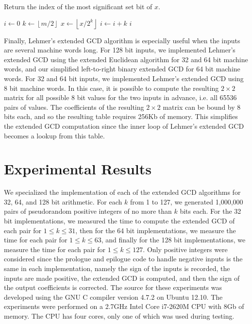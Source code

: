 \documentclass{ucalgthes1}
\theoremstyle{definition}
\newcommand{\floor}[1]{\left\lfloor #1 \right\rfloor}
\newcommand{\compiler}{GNU C compiler version 4.7.2}
\newcommand{\cpu}{2.7GHz Intel Core i7-2620M CPU}
\begin{document}
\begin{algorithm}[htb]
\caption{Return the index of the most significant set bit of $x$.}
\label{alg:msb}
\begin{algorithmic}[1]
\State $i \gets 0$
\State $k \gets \floor{m/2}$ 
		\State $x \gets \floor{x / 2^k}$
		\State $i \gets i + k$
	\EndIf
\EndWhile
\State \Return $i$
\end{algorithmic}
\end{algorithm}

Finally, Lehmer's extended GCD algorithm is especially useful when the inputs are several machine words long.  For 128 bit inputs, we implemented Lehmer's extended GCD using the extended Euclidean algorithm for 32 and 64 bit machine words, and our simplified left-to-right binary extended GCD for 64 bit machine words.  For 32 and 64 bit inputs, we implemented Lehmer's extended GCD using 8 bit machine words.  In this case, it is possible to compute the resulting $2 \times 2$ matrix for all possible 8 bit values for the two inputs in advance, i.e. all 65536 pairs of values.  The coefficients of the resulting $2 \times 2$ matrix can be bound by 8 bits each, and so the resulting table requires 256Kb of memory. This simplifies the extended GCD computation since the inner loop of Lehmer's extended GCD becomes a lookup from this table.

\section{Experimental Results}
\label{sec:gcdResults}

We specialized the implementation of each of the extended GCD algorithms for 32, 64, and 128 bit arithmetic.  For each $k$ from 1 to 127, we generated 1,000,000 pairs of pseudorandom positive integers of no more than $k$ bits each.  For the 32 bit implementations, we measured the time to compute the extended GCD of each pair for $1 \le k \le 31$, then for the 64 bit implementations, we measure the time for each pair for $1 \le k \le 63$, and finally for the 128 bit implementations, we measure the time for each pair for $1 \le k \le 127$.  Only positive integers were considered since the prologue and epilogue code to handle negative inputs is the same in each implementation, namely the sign of the inputs is recorded, the inputs are made positive, the extended GCD is computed, and then the sign of the output coefficients is corrected.  The source for these experiments was developed using the \compiler{} on Ubuntu 12.10.  The experiments were performed on a \cpu{} with 8Gb of memory.  The CPU has four cores, only one of which was used during testing.
\end{document}
